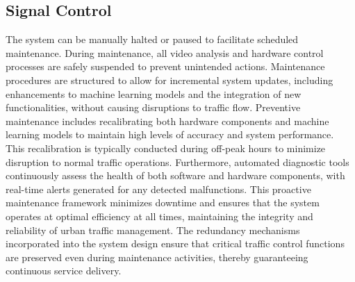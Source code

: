 \documentclass[usenatbib]{tjaa}
\begin{document}
\subsection{Signal Control}
The system can be manually halted or paused to facilitate scheduled maintenance. During maintenance, all video analysis and hardware control processes are safely suspended to prevent unintended actions. Maintenance procedures are structured to allow for incremental system updates, including enhancements to machine learning models and the integration of new functionalities, without causing disruptions to traffic flow. Preventive maintenance includes recalibrating both hardware components and machine learning models to maintain high levels of accuracy and system performance. This recalibration is typically conducted during off-peak hours to minimize disruption to normal traffic operations.
Furthermore, automated diagnostic tools continuously assess the health of both software and hardware components, with real-time alerts generated for any detected malfunctions. This proactive maintenance framework minimizes downtime and ensures that the system operates at optimal efficiency at all times, maintaining the integrity and reliability of urban traffic management. The redundancy mechanisms incorporated into the system design ensure that critical traffic control functions are preserved even during maintenance activities, thereby guaranteeing continuous service delivery.
\end{document}

